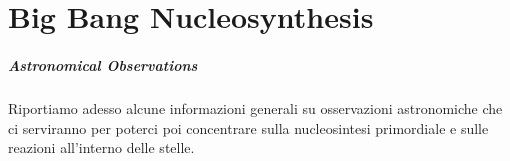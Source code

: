 \newcommand{\sol}{_{\odot}}
\newcommand{\Msol}{$M\sol { }$}


\chapter{Big Bang Nucleosynthesis}\label{cap-BBN}

\paragraph{Astronomical Observations}
Riportiamo adesso alcune informazioni generali su osservazioni astronomiche che ci serviranno per poterci poi concentrare sulla nucleosintesi primordiale e sulle reazioni all'interno delle stelle.



